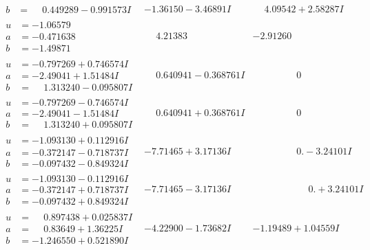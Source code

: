 \documentclass[1p]{elsarticle_modified}
\theoremstyle{definition}
\begin{document}
$$\begin{array}{c|c|c}
\begin{aligned}
b &= \phantom{-}0.449289 - 0.991573 I\end{aligned}
 & -1.36150 - 3.46891 I & \phantom{-}4.09542 + 2.58287 I \\ \hline\begin{aligned}
u &= -1.06579\phantom{ +0.000000I} \\
a &= -0.471638\phantom{ +0.000000I} \\
b &= -1.49871\phantom{ +0.000000I}\end{aligned}
 & \phantom{-}4.21383\phantom{ +0.000000I} & -2.91260\phantom{ +0.000000I} \\ \hline\begin{aligned}
u &= -0.797269 + 0.746574 I \\
a &= -2.49041 + 1.51484 I \\
b &= \phantom{-}1.313240 - 0.095807 I\end{aligned}
 & \phantom{-}0.640941 - 0.368761 I & \phantom{-0.000000 } 0 \\ \hline\begin{aligned}
u &= -0.797269 - 0.746574 I \\
a &= -2.49041 - 1.51484 I \\
b &= \phantom{-}1.313240 + 0.095807 I\end{aligned}
 & \phantom{-}0.640941 + 0.368761 I & \phantom{-0.000000 } 0 \\ \hline\begin{aligned}
u &= -1.093130 + 0.112916 I \\
a &= -0.372147 - 0.718737 I \\
b &= -0.097432 - 0.849324 I\end{aligned}
 & -7.71465 + 3.17136 I & \phantom{-0.000000 } 0. - 3.24101 I \\ \hline\begin{aligned}
u &= -1.093130 - 0.112916 I \\
a &= -0.372147 + 0.718737 I \\
b &= -0.097432 + 0.849324 I\end{aligned}
 & -7.71465 - 3.17136 I & \phantom{-0.000000 -}0. + 3.24101 I \\ \hline\begin{aligned}
u &= \phantom{-}0.897438 + 0.025837 I \\
a &= \phantom{-}0.83649 + 1.36225 I \\
b &= -1.246550 + 0.521890 I\end{aligned}
 & -4.22900 - 1.73682 I & -1.19489 + 1.04559 I \\ \hline\begin{aligned}

\end{aligned}
\end{array}$$
\end{document}
